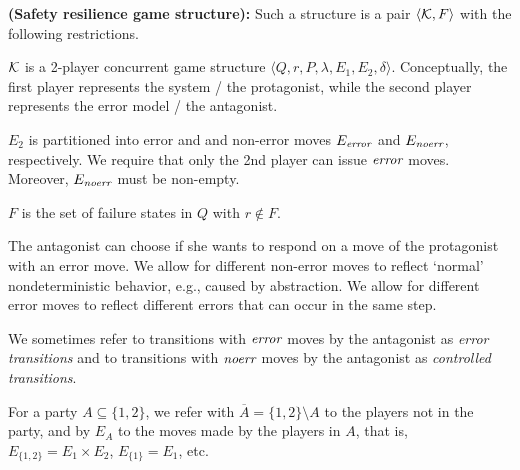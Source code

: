 \begin{definition} \label{def.srgs} 
{\bf (Safety resilience game structure):} 
Such a structure is a pair $\langle {\cal K}, F\rangle$ with the following 
restrictions. 
\begin{list1} 
\item ${\cal K}$ is a 2-player concurrent game structure 
  $\langle Q,r,P,\lambda,E_1,E_2,\delta\rangle$.  
  Conceptually, the first player represents the system / the protagonist, while 
  the second player represents the error model / the antagonist.  
\item $E_2$ is partitioned into error and and non-error moves $E_{\textit{error}}$ and $E_{\textit{noerr}}$, respectively.
We require that only the 2nd player can issue $\textit{error}$ moves.  
Moreover, $E_{\textit{noerr}}$ must be non-empty. 
\item $F$ is the set of failure states in $Q$ with $r\not\in F$.   
\end{list1} 


The antagonist can choose if she wants to respond on a move of the protagonist with an error move. \label{abstraction}
We allow for different non-error moves to reflect `normal' nondeterministic behavior, e.g., caused by abstraction. 
We allow for different error moves to reflect different errors that can occur in the same step.

We sometimes refer\label{reply1.reffer} to transitions with $\textit{error}$ moves by the antagonist as \emph{error transitions} and 
to transitions with  $\textit{noerr}$ moves by the antagonist as \emph{controlled transitions}.  

For a party $A \subseteq \{1,2\}$, we refer with $\overline{A} = \{1,2\} \setminus A$ to the players not in the party, and by $E_A$ to the moves made by the players in $A$, that is, $E_{\{1,2\}} = E_1 \times E_2$, $E_{\{1\}} = E_1$, etc.



\end{definition}

